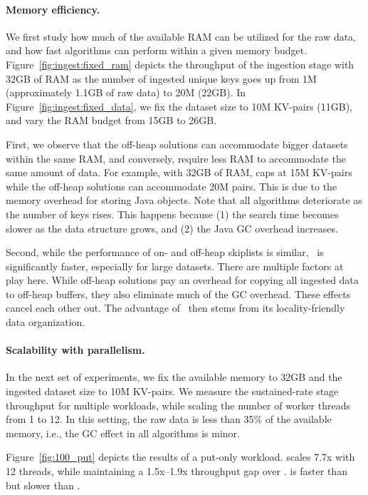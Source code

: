 \paragraph{Memory efficiency.}
We first study  how much of the available RAM can be utilized for the raw data, 
and how fast algorithms can perform within a given memory budget. 
Figure~\ref{fig:ingest:fixed_ram} depicts the  throughput of the ingestion stage 
with 32GB of RAM as the  number of ingested unique 
keys  goes up from 1M (approximately 1.1GB of raw data) to 20M (22GB). 
In Figure~\ref{fig:ingest:fixed_data}, we fix the dataset size to 10M KV-pairs (11GB), and vary the  
RAM budget from 15GB to 26GB.

First, we observe that the off-heap solutions can accommodate  bigger datasets within the same RAM,
and conversely, require less RAM to accommodate the same amount of data. 
For example, with 32GB of RAM,  \csl\/ caps at 15M KV-pairs while the off-heap solutions can accommodate 20M pairs.
This is due to the memory overhead for storing Java objects.
Note  that all algorithms deteriorate as the number of keys rises.
This happens because (1) the search time becomes  slower as the data structure grows, 
and (2) the Java GC overhead increases. 

Second, while the performance of on- and off-heap skiplists is  similar,  \oak\ is significantly faster, especially for large datasets.
There are multiple factors at play here. While off-heap solutions pay an overhead for 
copying all ingested data to off-heap buffers, they also eliminate much of the GC overhead. 
These effects cancel each other out. The  advantage of \oak\ then stems from its 
 locality-friendly data organization. %


\paragraph{Scalability with parallelism.}
In the next set of experiments, we fix the available memory to 32GB and the ingested dataset size to 10M KV-pairs. 
We measure the sustained-rate stage throughput for multiple workloads, while scaling the number of worker threads from 1 to 12. 
In this setting, the raw data is less than 35\% of the available memory, i.e., %
the GC effect in all algorithms is minor. 

Figure~\ref{fig:100_put} depicts the results of a put-only workload.
\oak\/ scales 7.7x with 12 threads, while maintaining a 1.5x--1.9x throughput gap over \csl.  
\YoniList\/ is faster than \csl\/ but slower than \oak. 


